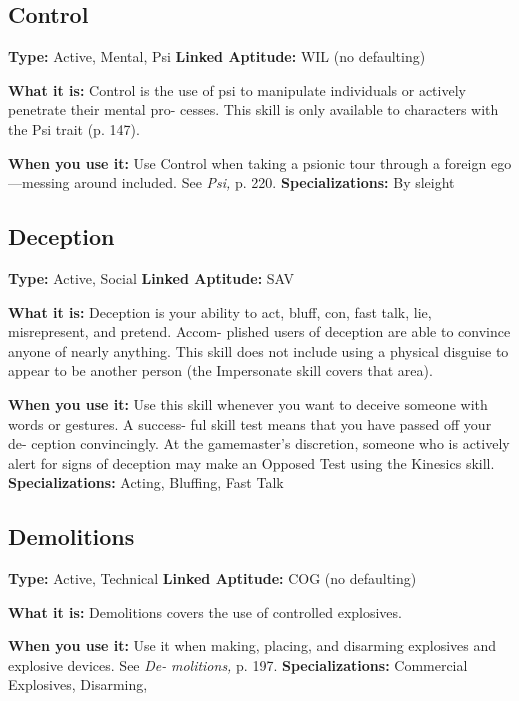 \subsection{Control}

\textbf{Type:} Active, Mental, Psi
\textbf{Linked Aptitude:} WIL (no defaulting)

\textbf{What it is:} Control is the use of psi to manipulate 
individuals or actively penetrate their mental pro-
cesses. This skill is only available to characters with 
the Psi trait (p. 147).

\textbf{When you use it:} Use Control when taking a psionic 
tour through a foreign ego—messing around included. 
See \textit{Psi,} p. 220.
\textbf{Specializations:} By sleight

\subsection{Deception}

\textbf{Type:} Active, Social
\textbf{Linked Aptitude:} SAV

\textbf{What it is:} Deception is your ability to act, bluff, 
con, fast talk, lie, misrepresent, and pretend. Accom-
plished users of deception are able to convince anyone 
of nearly anything. This skill does not include using a 
physical disguise to appear to be another person (the 
Impersonate skill covers that area).

\textbf{When you use it:} Use this skill whenever you want 
to deceive someone with words or gestures. A success-
ful skill test means that you have passed off your de-
ception convincingly. At the gamemaster's discretion, 
someone who is actively alert for signs of deception 
may make an Opposed Test using the Kinesics skill.
\textbf{Specializations:} Acting, Bluffing, Fast Talk

\subsection{Demolitions}

\textbf{Type:} Active, Technical
\textbf{Linked Aptitude:} COG (no defaulting)

\textbf{What it is:} Demolitions covers the use of controlled 
explosives.

\textbf{When you use it:} Use it when making, placing, and 
disarming explosives and explosive devices. See \textit{De-}
\textit{molitions,} p. 197.
\textbf{Specializations:} Commercial Explosives, Disarming, 

